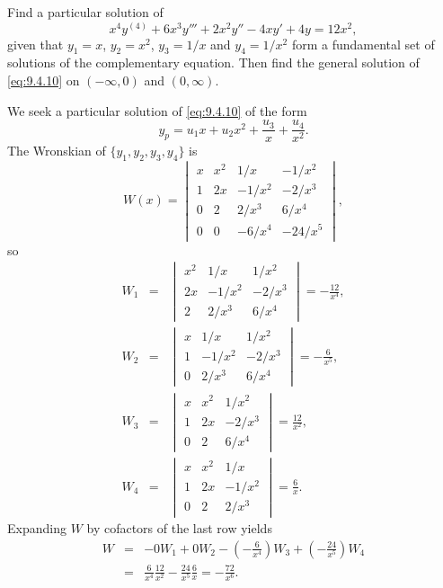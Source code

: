 \documentclass{ximera}
\begin{document}
\begin{example}\label{example:9.4.2}
 Find a particular solution of
\begin{equation} \label{eq:9.4.10}
x^4y^{(4)}+6x^3y'''+2x^2y''-4xy'+4y=12x^2,
\end{equation}
given that  $y_1=x$, $y_2=x^2$, $y_3=1/x$ and $y_4=1/x^2$ form a
fundamental set of solutions of the complementary equation. Then find
the general solution of \eqref{eq:9.4.10} on $(-\infty,0)$ and
$(0,\infty)$.
 

\begin{explanation}
We seek a particular solution of \eqref{eq:9.4.10} of the form
$$
y_p=u_1x+u_2x^2+\frac{u_3}{x}+\frac{u_4}{x^2}.
$$
The Wronskian of  $\{y_1,y_2,y_3,y_4\}$ is
$$
W(x)=\begin{vmatrix}
 x&x^2&1/x&-1/x^2 \\
 1&2x&-1/x^2&-2/x^3 \\
 0&2&2/x^3&6/x^4\\
0&0&-6/x^4&-24/x^5
\end{vmatrix},
$$
so
\begin{eqnarray*}
W_1&=&
\begin{vmatrix}
x^2&1/x&1/x^2\\
2x&-1/x^2&-2/x^3\\
2&2/x^3&6/x^4
\end{vmatrix}=-\frac{12}{x^4},\\
W_2&=&
\begin{vmatrix}
x&1/x&1/x^2\\
1&-1/x^2&-2/x^3\\
0&2/x^3&6/x^4
\end{vmatrix}=-\frac{6}{x^5},\\
W_3&=&
\begin{vmatrix}
x&x^2&1/x^2\\
1&2x&-2/x^3\\
0&2&6/x^4
\end{vmatrix} =\frac{12}{x^2},  \\
W_4&=&
\begin{vmatrix}
x&x^2&1/x\\
1&2x&-1/x^2\\
0&2&2/x^3
\end{vmatrix}=\frac{6}{x}.
\end{eqnarray*}
Expanding $W$ by cofactors of the last row yields
\begin{eqnarray*}
W&=&-0W_1+0 W_2-\left(-\frac{6}{x^4}\right)W_3+\left(-\frac{24}{x^5}\right)W_4\\
&=&\frac{6}{x^4}\frac{12}{x^2}-\frac{24}{x^5}\frac{6}{x}=-\frac{72}{x^6}.

\end{eqnarray*}
\end{explanation}
\end{example}
\end{document}
